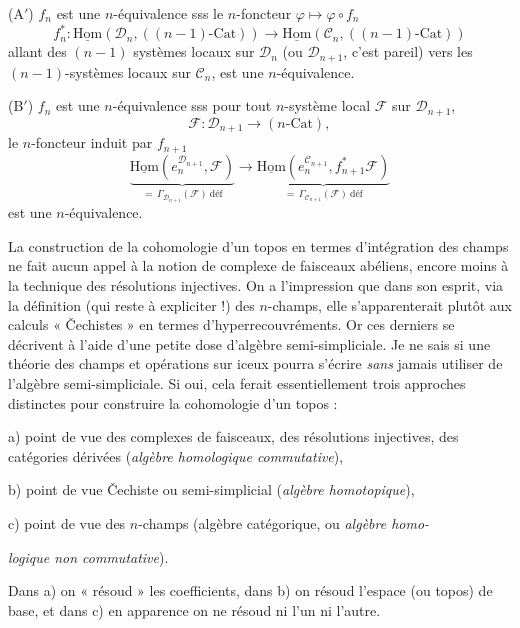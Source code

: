 \documentclass[11pt,a4paper]{article}
\begin{document}
(A$'$) $f_n$ est une $n$-équivalence sss le $n$-foncteur $\varphi \mapsto \varphi \circ f_n$
\[
f_n^*\colon \underline{\mathrm{Hom}}(\mathcal{D}_n, ((n-1)\text{-}\mathrm{Cat})) \to \underline{\mathrm{Hom}}(\mathcal{C}_n, ((n-1)\text{-}\mathrm{Cat}))
\]
allant des $(n-1)$ systèmes locaux sur $\mathcal{D}_n$ (ou $\mathcal{D}_{n+1}$, c'est pareil) vers les $(n-1)$-systèmes locaux sur $\mathcal{C}_n$, est une $n$-équivalence.

(B$'$) $f_n$ est une $n$-équivalence sss pour tout $n$-système local $\mathcal{F}$ sur $\mathcal{D}_{n+1}$,
\[
\mathcal{F}\colon \mathcal{D}_{n+1} \to (n\text{-}\mathrm{Cat}),
\]
le $n$-foncteur induit par $f_{n+1}$
\[
\underbrace{\underline{\mathrm{Hom}}(e^{\mathcal{D}_{n+1}}_n, \mathcal{F})}_{=\, \Gamma_{\mathcal{D}_{n+1}}(\mathcal{F})\ \text{déf}}
\to
\underbrace{\underline{\mathrm{Hom}}(e^{\mathcal{C}_{n+1}}_n, f_{n+1}^*\mathcal{F})}_{=\, \Gamma_{\mathcal{C}_{n+1}}(\mathcal{F})\ \text{déf}}
\]
est une $n$-équivalence.

La construction de la cohomologie d'un topos en termes d'intégration des champs ne fait aucun appel à la notion de complexe de faisceaux abéliens, encore moins à la technique des résolutions injectives. On a l'impression que dans son esprit, via la définition (qui reste à expliciter !) des $n$-champs, elle s'apparenterait plutôt aux calculs « Čechistes » en termes d'hyperrecouvréments. Or ces derniers se décrivent à l'aide d'une petite dose d'algèbre semi-simpliciale. Je ne sais si une théorie des champs et opérations sur iceux pourra s'écrire \emph{sans} jamais utiliser de l'algèbre semi-simpliciale. Si oui, cela ferait essentiellement trois approches distinctes pour construire la cohomologie d'un topos :

a) point de vue des complexes de faisceaux, des résolutions injectives, des catégories dérivées (\emph{algèbre homologique commutative}),

b) point de vue Čechiste ou semi-simplicial (\emph{algèbre homotopique}),

c) point de vue des $n$-champs (algèbre catégorique, ou \emph{algèbre homo-}

\emph{logique non commutative}).

Dans a) on « résoud » les coefficients, dans b) on résoud l'espace (ou topos) de base, et dans c) en apparence on ne résoud ni l'un ni l'autre.
\end{document}

